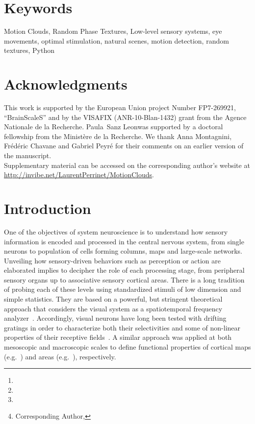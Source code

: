 \documentclass[a4paper,11pt]{article}%
\title{\Title}%
\author[1,2]{\AuthorA \thanks{\EmailA}}
\author[1,2]{\AuthorB \thanks{\EmailB}}
\author[1,2]{\AuthorC \thanks{\EmailC}}
\author[1,2]{\AuthorD \thanks{Corresponding Author, \EmailD}}%
\affil[1]{\AddressA}
\affil[2]{\AddressB}
\date{}%
\newcommand{\AuthorA}{Paula~Sanz Leon}%
\newcommand{\Website}{http://invibe.net/LaurentPerrinet}%
\newcommand{\Abstract}{%
Choosing an appropriate set of stimuli is essential in order to characterize the response of a sensory system to a particular functional dimension, such as the eye movement following the motion of a visual scene. %
Here, we describe a framework to generate random texture movies with controlled information content, i.e., Motion Clouds. These stimuli are defined using a generative model which is based on controlled experimental parametrization. %
We show that Motion Clouds correspond to dense mixing of localized moving gratings with random positions. Their global envelope is similar to natural-like stimulation with an approximate full-field translation corresponding to a retinal slip. %
We describe the construction of these stimuli mathematically and propose an open-source python-based implementation. %
Examples of the use of this framework are shown. We also propose extensions to other modalities such as color vision, touch and audition.%
}%
\newcommand{\Keywords}%
{Motion Clouds, Random Phase Textures, Low-level sensory systems, eye movements, optimal stimulation, natural scenes, motion detection, random textures, Python}
\newcommand{\Acknowledgments}{%
This work is supported by the European Union project Number FP7-269921, ``BrainScaleS'' and by the VISAFIX (ANR-10-Blan-1432)  grant from the Agence Nationale de la Recherche. \AuthorA was supported by a doctoral fellowship from the Minist{\`e}re de la Recherche. We thank Anna Montagnini, Fr\'ed\'eric Chavane and Gabriel Peyr\'e for their comments on an earlier version of the manuscript. \\ Supplementary material can be accessed on the corresponding author's website at \url{\Website/MotionClouds}.}%
\begin{document}
\maketitle
\begin{abstract}
\Abstract
\end{abstract}%
\section*{Keywords}
\Keywords
\section*{Acknowledgments}
\Acknowledgments
\section{Introduction }\label{intro}

One of the objectives of system neuroscience is to understand how sensory information is encoded and processed in the central nervous system, from single neurons to population of cells forming columns, maps and large-scale networks. Unveiling how sensory-driven behaviors such as perception or action are elaborated implies to decipher the role of each processing stage, from peripheral sensory organs up to associative sensory cortical areas. There is a long tradition of probing each of these levels using standardized stimuli of low dimension and simple statistics. They are based on a powerful, but stringent theoretical approach that considers the visual system as a spatiotemporal frequency analyzer~\citep{Graham79,Watson83}. Accordingly, visual neurons have long been tested with drifting gratings in order to characterize both their selectivities and some of non-linear properties of their receptive fields~\citep{DeValois1988Spatial}. A similar approach was applied at both mesoscopic and macroscopic scales to define functional properties of cortical maps (e.g.~\citep{Blasdel86,TsO90}) and areas (e.g.~\citep{Singh2000Spatiotemporal,Henriksson08}), respectively.  
\end{document}
